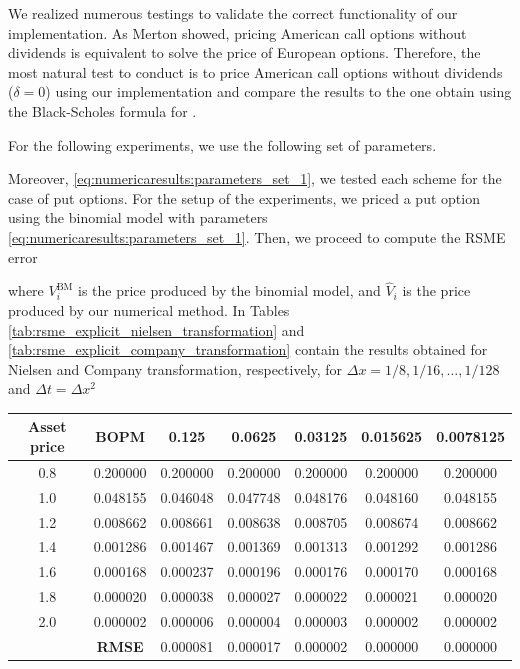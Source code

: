 We realized numerous testings to validate the correct functionality of our implementation. As Merton \cite{merton_1973} showed, pricing American call options without dividends is equivalent to solve the price of European options. Therefore, the most natural test to conduct is to price American call options without dividends ($\delta=0$) using our implementation and compare the results to the one obtain using the Black-Scholes formula for  \cite{merton_1973}. 

For the following experiments, we use the following set of parameters.

Moreover, \eqref{eq:numericaresults:parameters_set_1}, we tested each scheme for the case of put options. For the setup of the experiments, we priced a put option using the binomial model \cite{cox_1979} with parameters \eqref{eq:numericaresults:parameters_set_1}. Then, we proceed to compute the RSME error 

where $V^{\text{BM}}_i$ is the price produced by the binomial model, and $\hat{V}_i$ is the price produced by our numerical method. In Tables \eqref{tab:rsme_explicit_nielsen_transformation} and \eqref{tab:rsme_explicit_company_transformation} contain the results obtained for Nielsen and Company transformation, respectively, for $\Delta{x}=1/8, 1/16,\dots,1/128$ and $\Delta{t}=\Delta{x}^2$

\begin{table}[H]
    \begin{tabular}{@{}ccccccc@{}}
        \toprule
        \textbf{Asset price} & \textbf{BOPM} & 0.125    & 0.0625   & 0.03125  & 0.015625 & 0.0078125 \\ \midrule
        0.8                  & 0.200000      & 0.200000 & 0.200000 & 0.200000 & 0.200000 & 0.200000  \\
        1.0                  & 0.048155      & 0.046048 & 0.047748 & 0.048176 & 0.048160 & 0.048155  \\
        1.2                  & 0.008662      & 0.008661 & 0.008638 & 0.008705 & 0.008674 & 0.008662  \\
        1.4                  & 0.001286      & 0.001467 & 0.001369 & 0.001313 & 0.001292 & 0.001286  \\
        1.6                  & 0.000168      & 0.000237 & 0.000196 & 0.000176 & 0.000170 & 0.000168  \\
        1.8                  & 0.000020      & 0.000038 & 0.000027 & 0.000022 & 0.000021 & 0.000020  \\
        2.0                  & 0.000002      & 0.000006 & 0.000004 & 0.000003 & 0.000002 & 0.000002  \\
                             & \textbf{RMSE} & 0.000081 & 0.000017 & 0.000002 & 0.000000 & 0.000000  \\ \bottomrule
    \end{tabular}
\end{table}

